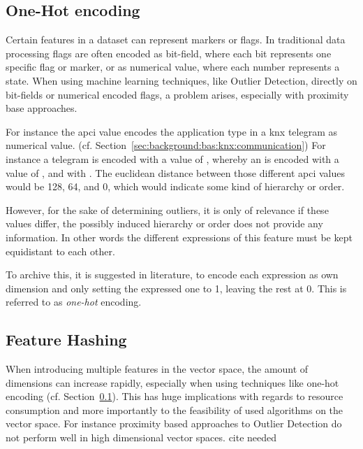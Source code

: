 \subsection{One-Hot encoding}
\label{sec:background:network:features:onehot}

Certain features in a dataset can represent markers or flags. In traditional data processing flags are often encoded as bit-field, where each bit represents one specific flag or marker, or as numerical value, where each number represents a state.
When using machine learning techniques, like Outlier Detection, directly on bit-fields or numerical encoded flags, a problem arises, especially with proximity base approaches.

For instance the \gls{apci} value encodes the application type in a \gls{knx} telegram as numerical value. (cf. Section~\ref{sec:background:bas:knx:communication})
For instance a  telegram is encoded with a value of , whereby an  is encoded with a value of , and  with .
The euclidean distance between those different \gls{apci} values would be 128, 64, and 0, which would indicate some kind of hierarchy or order.

However, for the sake of determining outliers, it is only of relevance if these values differ, the possibly induced hierarchy or order does not provide any information.
In other words the different expressions of this feature must be kept equidistant to each other.

To archive this, it is suggested in literature, to encode each expression as own dimension and only setting the expressed one to 1, leaving the rest at 0. This is referred to as \emph{one-hot} encoding. \parencite[cf.][]{Coates2011}

\subsection{Feature Hashing}
\label{sec:background:network:features:hashing}

When introducing multiple features in the vector space, the  amount of dimensions can increase rapidly, especially when using techniques like one-hot encoding (cf. Section~\ref{sec:background:network:features:onehot}).
This has huge implications with regards to resource consumption and more importantly to the feasibility of used algorithms on the vector space.
For instance proximity based approaches to Outlier Detection do not perform well in high dimensional vector spaces. \alert{cite needed}

